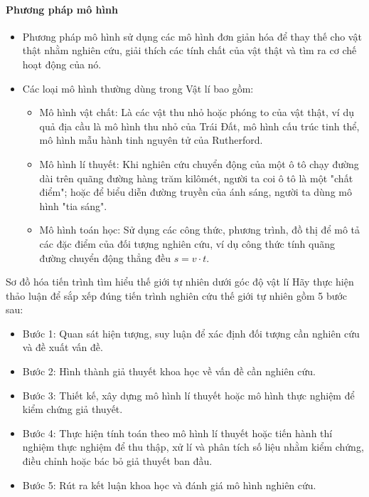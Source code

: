 \paragraph{Phương pháp mô hình}
\begin{itemize}
\item Phương pháp mô hình sử dụng các mô hình đơn giản hóa để thay thế cho vật thật nhằm nghiên cứu, giải thích các tính chất của vật thật và tìm ra cơ chế hoạt động của nó.
\item Các loại mô hình thường dùng trong Vật lí bao gồm:
\begin{itemize}
\item Mô hình vật chất: Là các vật thu nhỏ hoặc phóng to của vật thật, ví dụ quả địa cầu là mô hình thu nhỏ của Trái Đất, mô hình cấu trúc tinh thể, mô hình mẫu hành tinh nguyên tử của Rutherford.
\item Mô hình lí thuyết: Khi nghiên cứu chuyển động của một ô tô chạy đường dài trên quãng đường hàng trăm kilômét, người ta coi ô tô là một "chất điểm"; hoặc để biểu diễn đường truyền của ánh sáng, người ta dùng mô hình "tia sáng".
\item Mô hình toán học: Sử dụng các công thức, phương trình, đồ thị để mô tả các đặc điểm của đối tượng nghiên cứu, ví dụ công thức tính quãng đường chuyển động thẳng đều $s = v \cdot t$.
\end{itemize}
\end{itemize}
\begin{hoatdong}{Sơ đồ hóa tiến trình tìm hiểu thế giới tự nhiên dưới góc độ vật lí}
Hãy thực hiện thảo luận để sắp xếp đúng tiến trình nghiên cứu thế giới tự nhiên gồm 5 bước sau:
\begin{itemize}
\item Bước 1: Quan sát hiện tượng, suy luận để xác định đối tượng cần nghiên cứu và đề xuất vấn đề.
\item Bước 2: Hình thành giả thuyết khoa học về vấn đề cần nghiên cứu.
\item Bước 3: Thiết kế, xây dựng mô hình lí thuyết hoặc mô hình thực nghiệm để kiểm chứng giả thuyết.
\item Bước 4: Thực hiện tính toán theo mô hình lí thuyết hoặc tiến hành thí nghiệm thực nghiệm để thu thập, xử lí và phân tích số liệu nhằm kiểm chứng, điều chỉnh hoặc bác bỏ giả thuyết ban đầu.
\item Bước 5: Rút ra kết luận khoa học và đánh giá mô hình nghiên cứu.
\end{itemize}
\end{hoatdong}
